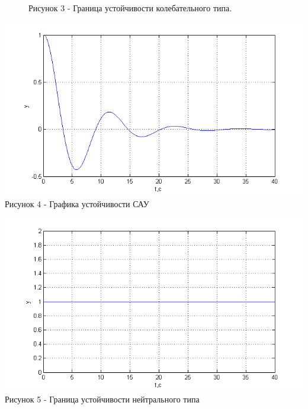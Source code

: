 \documentclass[a4paper, 11pt]{article}
\begin{document}
\begin{figure}[h]
	
	\\
	\centering Рисунок 3 - Граница устойчивости колебательного типа.
\end{figure}

\begin{center}
	\includegraphics[width=0.7\linewidth]{3}
	\\
\centering Рисунок 4 - Графика устойчивости САУ
	

\end{center}

\begin{center}
	\includegraphics[width=0.7\linewidth]{5}
	\\
	\centering Рисунок 5 - Граница устойчивости нейтрального типа
	
	
\end{center}
\end{document}
